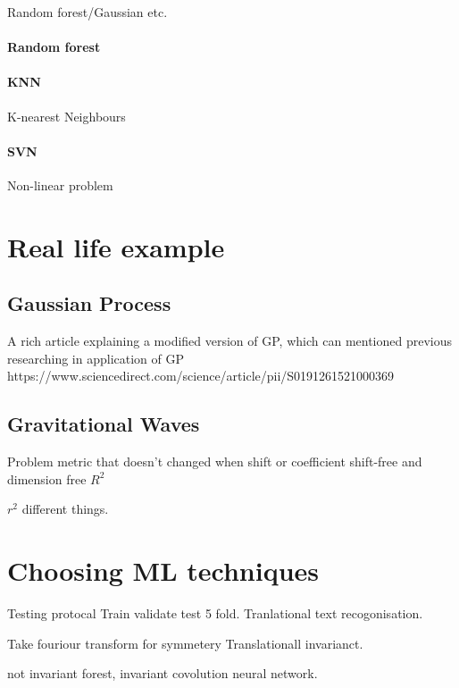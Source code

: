 \documentclass[12pt,a4paper]{article}
\begin{document}
Random forest/Gaussian etc.
\paragraph{Random forest}
\paragraph*{KNN}
K-nearest Neighbours
\paragraph*{SVN}
Non-linear problem
\section{Real life example}
\subsection{Gaussian Process}

A rich article explaining a modified version of GP, which can mentioned previous researching in application of GP
https://www.sciencedirect.com/science/article/pii/S0191261521000369

\subsection{Gravitational Waves}
Problem 
metric that doesn't changed when shift or 
coefficient  shift-free and dimension free
$R^2$

$r^2$ different things.
\section{Choosing ML techniques}
Testing protocal 
Train validate test 5 fold. 
Tranlational text recogonisation. 

Take fouriour transform for symmetery
Translationall invarianct.

not invariant forest,
invariant covolution neural network.
\end{document}
